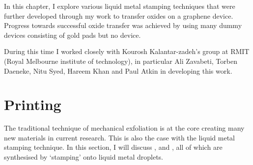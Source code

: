 \documentclass[../Matt_Gebert_Honours_Thesis.tex]{subfiles}
\begin{document}

	In this chapter, I explore various liquid metal stamping techniques\cite{zavabeti_liquid_2017} that were further developed through my work to transfer oxides on a graphene device. Progress towards successful oxide transfer was achieved by using many dummy devices consisting of gold pads but no device.
	
	During this time I worked closely with Kourosh Kalantar-zadeh's group at RMIT (Royal Melbourne institute of technology), in particular Ali Zavabeti, Torben Daeneke, Nitu Syed, Hareem Khan and Paul Atkin in developing this work.

	\section{Printing}\label{sec:printing}
		The traditional technique of mechanical exfoliation is at the core creating many new materials in current research. This is also the case with the liquid metal stamping technique. In this section, I will discuss \aluminimumoxide{}, \tinoxide{} and \bismuthoxide{}, all of which are synthesised by `stamping' onto liquid metal droplets. 
		
\end{document}
